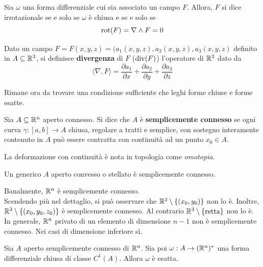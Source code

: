 \begin{definition} \label{Def: Campo irrotazionale}
    Sia $\omega$ una forma differenziale cui sia associato un campo $F$. Allora, $F$ si dice irrotazionale se e solo se $\omega$ è chiusa e se e solo se
    \begin{equation*}
      \operatorname{rot}(F) = \nabla \wedge F = 0  
    \end{equation*}
\end{definition}
\begin{definition} \label{Def: Divergenza}
    Dato un campo $F= F(x,y,z)= (a_1(x,y,z), a_2(x,y,z), a_3(x,y,z)$ definito in $A \subseteq \mathbb{R}^3$, si definisce \textbf{divergenza} di $F$ ($\operatorname{div}(F)$) l'operatore di $\mathbb{R}^3$ dato da
    \begin{equation*}
        \langle \nabla, F \rangle = \frac{\partial a_1}{\partial x} + \frac{\partial a_2}{\partial y} + \frac{\partial a_3}{\partial z}
    \end{equation*}
\end{definition}
Rimane ora da trovare una condizione sufficiente che leghi forme chiuse e forme esatte. 
\begin{definition}
    Sia $A \subseteq \mathbb{R}^n$ aperto connesso. Si dice che $A$ è \textbf{semplicemente connesso} se ogni curva $\gamma:[a,b] \to A$ chiusa, regolare a tratti e semplice, con sostegno interamente contenuto in $A$ può essere contratta con continuità ad un punto $x_0 \in A$.
\end{definition}
\begin{oss}
    La deformazione con continuità è nota in topologia come \textit{omotopia}.
\end{oss}
\begin{oss}
    Un generico $A$ aperto convesso o stellato è semplicemente connesso.
\end{oss}
\begin{example}
    Banalmente, $\mathbb{R}^n$ è semplicemente connesso.\\
    Scendendo più nel dettaglio, si può osservare che $\mathbb{R}^2 \setminus \left\{(x_0,y_0)\right\}$ non lo è.
    Inoltre, $\mathbb{R}^3 \setminus \left\{(x_0, y_0, z_0)\right\}$ è semplicemente connesso. Al contrario $\mathbb{R}^3 \setminus \left\{\text{retta}\right\}$ non lo è.\\
    In generale, $\mathbb{R}^n$ privato di un elemento di dimensione $n-1$ non è semplicemente connesso. Nei casi di dimensione inferiore sì.
\end{example}
\begin{theorem} \label{Teo: Forma chiusa => forma esatta in spazi semplicemente connessi}
    Sia $A$ aperto semplicemente connesso di $\mathbb{R}^n$. Sia poi $\omega: A \to (\mathbb{R}^n)^*$ una forma differenziale chiusa di classe $C^1(A)$. Allora $\omega$ è esatta.
\end{theorem}
